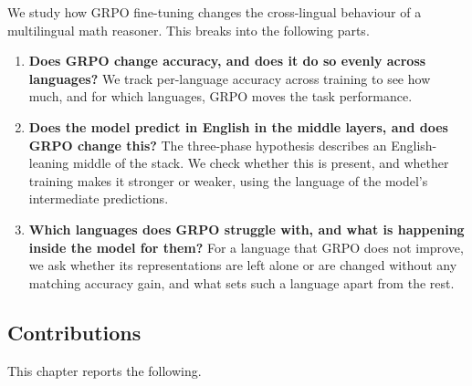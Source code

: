 We study how GRPO fine-tuning changes the cross-lingual behaviour of a multilingual
math reasoner. This breaks into the following parts.

\begin{enumerate}
	\item \textbf{Does GRPO change accuracy, and does it do so evenly across
		languages?} We track per-language accuracy across training to see how much, and
	for which languages, GRPO moves the task performance.
	
	\item \textbf{Does the model predict in English in the middle layers, and does
		GRPO change this?} The three-phase hypothesis describes an English-leaning
	middle of the stack. We check whether this is present, and whether training
	makes it stronger or weaker, using the language of the model's intermediate
	predictions.
	
	\item \textbf{Which languages does GRPO struggle with, and what is happening
		inside the model for them?} For a language that GRPO does not improve, we ask
	whether its representations are left alone or are changed without any matching
	accuracy gain, and what sets such a language apart from the rest.
\end{enumerate}

\subsection{Contributions}
\label{subsec:grpo-contributions}

This chapter reports the following.

